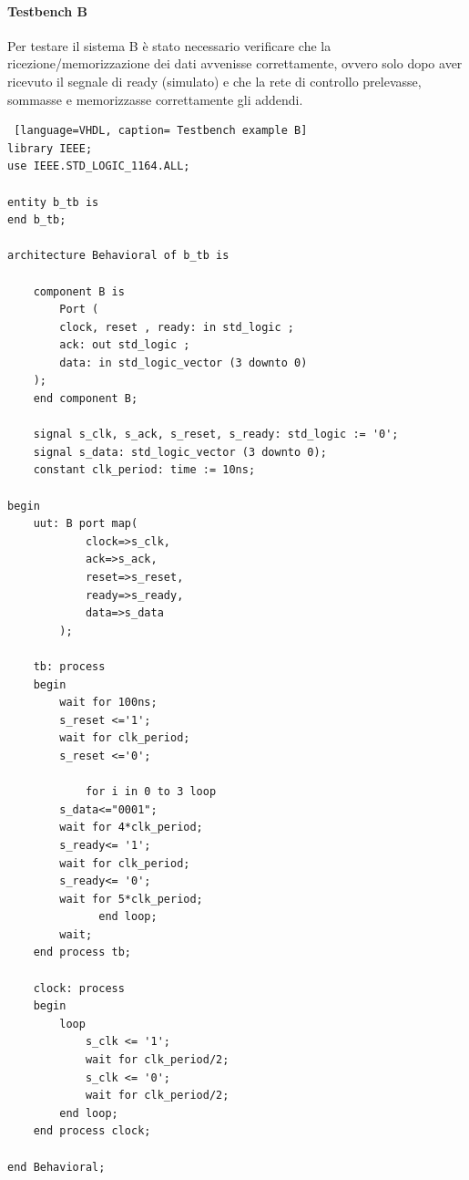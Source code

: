 \paragraph{Testbench B}
Per testare il sistema B è stato necessario verificare che la ricezione/memorizzazione dei dati avvenisse correttamente, ovvero solo dopo aver ricevuto il segnale di ready (simulato) e che la rete di controllo prelevasse, sommasse e memorizzasse correttamente gli addendi.
\begin{lstlisting} [language=VHDL, caption= Testbench example B]
library IEEE;
use IEEE.STD_LOGIC_1164.ALL;

entity b_tb is
end b_tb;

architecture Behavioral of b_tb is

    component B is
        Port (
        clock, reset , ready: in std_logic ;
        ack: out std_logic ;
        data: in std_logic_vector (3 downto 0)
    );
    end component B;

    signal s_clk, s_ack, s_reset, s_ready: std_logic := '0';
    signal s_data: std_logic_vector (3 downto 0);
    constant clk_period: time := 10ns;

begin
    uut: B port map(
            clock=>s_clk,
            ack=>s_ack,
            reset=>s_reset,
            ready=>s_ready,
            data=>s_data
        );

    tb: process
    begin
        wait for 100ns;
        s_reset <='1';
        wait for clk_period;
        s_reset <='0';
        
            for i in 0 to 3 loop
        s_data<="0001";
        wait for 4*clk_period;
        s_ready<= '1';        
        wait for clk_period;
        s_ready<= '0';
        wait for 5*clk_period;
              end loop;
        wait;
    end process tb;

    clock: process
    begin
        loop
            s_clk <= '1';
            wait for clk_period/2;
            s_clk <= '0';
            wait for clk_period/2;
        end loop;
    end process clock;
    
end Behavioral;

\end{lstlisting}

